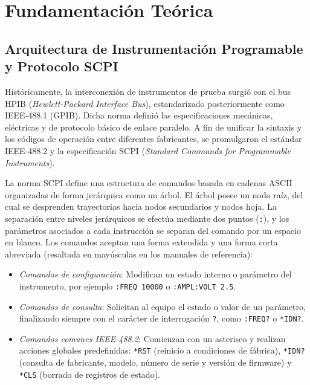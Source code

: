 \section{Fundamentación Teórica}

\subsection{Arquitectura de Instrumentación Programable y Protocolo SCPI}
Históricamente, la interconexión de instrumentos de prueba surgió con el bus HPIB (\emph{Hewlett-Packard Interface
Bus}), estandarizado posteriormente como IEEE-488.1 (GPIB). Dicha norma definió las especificaciones mecánicas,
eléctricas y de protocolo básico de enlace paralelo. A fin de unificar la sintaxis y los códigos de operación entre
diferentes fabricantes, se promulgaron el estándar IEEE-488.2 y la especificación SCPI (\emph{Standard Commands for
Programmable Instruments}).

La norma SCPI define una estructura de comandos basada en cadenas ASCII organizadas de forma jerárquica como un árbol.
El árbol posee un nodo raíz, del cual se desprenden trayectorias hacia nodos secundarios y nodos
hoja. La separación entre niveles jerárquicos se efectúa mediante dos puntos (\texttt{:}), y los
parámetros asociados a cada instrucción se separan del comando por un espacio en blanco. Los comandos aceptan una
forma extendida y una forma corta abreviada (resaltada en mayúsculas en los manuales de referencia):
\begin{itemize}
    \item \emph{Comandos de configuración}: Modifican un estado interno o parámetro del instrumento, por ejemplo
    \texttt{:FREQ 10000} o \texttt{:AMPL:VOLT 2.5}.
\item \emph{Comandos de consulta}: Solicitan al equipo el estado o valor de un parámetro,
    finalizando siempre con el carácter de interrogación \texttt{?}, como \texttt{:FREQ?} o \texttt{*IDN?}.
    \item \emph{Comandos comunes IEEE-488.2}: Comienzan con un asterisco y realizan acciones globales
    predefinidas: \texttt{*RST} (reinicio a condiciones de fábrica), \texttt{*IDN?} (consulta de fabricante, modelo,
    número de serie y versión de firmware) y \texttt{*CLS} (borrado de registros de estado).
\end{itemize}

